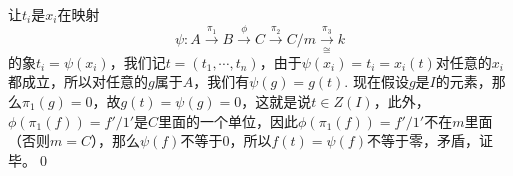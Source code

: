 让$t_i$是$x_i$在映射
\[
	\psi:A\xrightarrow{\pi_1}B\xrightarrow{\phi}C\xrightarrow{\pi_2}C/m\xrightarrow[\cong]{\pi_3} k
\]
的象$t_i=\psi(x_i)$，我们记$t=(t_1,\cdots ,t_n)$，由于$\psi(x_i)=t_i=x_i(t)$对任意的$x_i$都成立，所以对任意的$g$属于$A$，我们有$\psi(g)=g(t)$.
现在假设$g$是$I$的元素，那么$\pi_1(g)=0$，故$g(t)=\psi(g)=0$，这就是说$t\in Z(I)$，此外，$\phi(\pi_1(f))=f'/1'$是$C$里面的一个单位，因此$\phi(\pi_1(f))=f'/1'$不在$m$里面（否则$m=C$），那么$\psi(f)$不等于$0$，所以$f(t)=\psi(f)$不等于零，矛盾，证毕。\qed